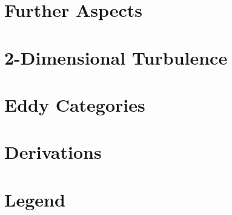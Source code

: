 
\appendix
\begin{appendices}
\begin{small}



\chapter{Further Aspects}

\chapter{2-Dimensional Turbulence}

\chapter{Eddy Categories}

\chapter{Derivations}


\chapter{Legend}



\end{small}
\end{appendices}
\FloatBarrier




